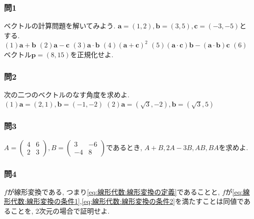 \documentclass[a4j,dvipdfmx]{jsarticle}
\numberwithin{equation}{section}
\begin{document}
        \subsubsection*{問1} ベクトルの計算問題を解いてみよう. $\bm{a}=(1,2),\bm{b}=(3,5),\bm{c}=(-3,-5)$とする.\\
            $(1)\bm{a}+\bm{b}$\hspace{1mm}
            $(2)\bm{a}-\bm{c}$\hspace{1mm}
            $(3)\bm{a}\cdot\bm{b}$\hspace{1mm}
            $(4)(\bm{a}+\bm{c})^2$\hspace{1mm}
            $(5)(\bm{a}\cdot\bm{c})\bm{b}-(\bm{a}\cdot\bm{b})\bm{c}$\hspace{1mm}
            $(6)$ベクトル$\bm{p}=(8,15)$を正規化せよ.

        \subsubsection*{問2} 次の二つのベクトルのなす角度を求めよ.\\
            $(1)\bm{a}=(2,1),\bm{b}=(-1,-2)$\hspace{1mm}
            $(2)\bm{a}=(\sqrt{3},-2),\bm{b}=(\sqrt{3},5)$

        \subsubsection*{問3}$A=\begin{pmatrix}4 & 6\\2 & 3\end{pmatrix},B=\begin{pmatrix}3 & -6\\-4 & 8\end{pmatrix}$であるとき, $A+B,2A-3B,AB,BA$を求めよ.
        
        \subsubsection*{問4}$f$が線形変換である, つまり\eqref{eq:線形代数:線形変換の定義}であることと, $f$が\eqref{eq:線形代数:線形変換の条件1},\eqref{eq:線形代数:線形変換の条件2}を満たすことは同値であることを, 2次元の場合で証明せよ.
\end{document}

